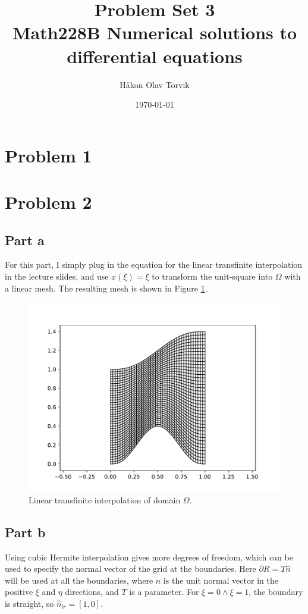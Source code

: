 \documentclass[aps, 12pt]{revtex4}
\begin{document}
\author{Håkon Olav Torvik}
\title{\Huge Problem Set 3 \\ \small Math228B Numerical solutions to differential equations}
\date{\today}


\maketitle

\section*{Problem 1}

\section*{Problem 2}
\subsection*{Part a}
For this part, I simply plug in the equation for the linear transfinite interpolation in the lecture slides, and use $x(\xi)=\xi$ to transform the unit-square into $\Omega$ with a linear mesh. The resulting mesh is shown in Figure \ref{fig:tfi_linear}.

\begin{figure}
    \includegraphics[width=0.8\linewidth]{linear.pdf}
    \caption{Linear transfinite interpolation of domain $\Omega$.}
    \label{fig:tfi_linear}
\end{figure}

\subsection*{Part b}
Using cubic Hermite interpolation gives more degrees of freedom, which can be used to specify the normal vector of the grid at the boundaries. Here $\partial R = T\hat{n}$ will be used at all the boundaries, where $\hat{n}$ is the unit normal vector in the positive $\xi$ and $\eta$ directions, and $T$ is a parameter. For $\xi = 0 \land \xi=1$, the boundary is straight, so $\hat{n}_{lr} = [1, 0]$.
\end{document}
